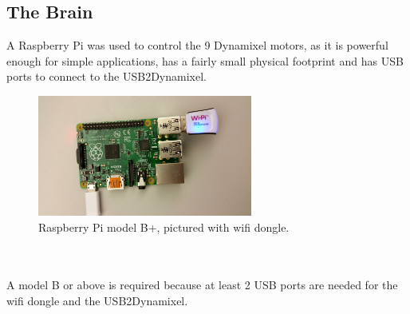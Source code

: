 \documentclass[]{article}
\begin{document}
\subsection{The Brain}
A Raspberry Pi was used to control the 9 Dynamixel motors, as it is powerful enough for simple applications, has a fairly small physical footprint and has USB ports to connect to the USB2Dynamixel.
\begin{figure}[h]
\centering
\includegraphics[width=200pt]{report_images/pi.jpg}
\caption{Raspberry Pi model B+, pictured with wifi dongle.}
\end{figure}
\\
\\
A model B or above is required because at least 2 USB ports are needed for the wifi dongle and the USB2Dynamixel.
\end{document}
